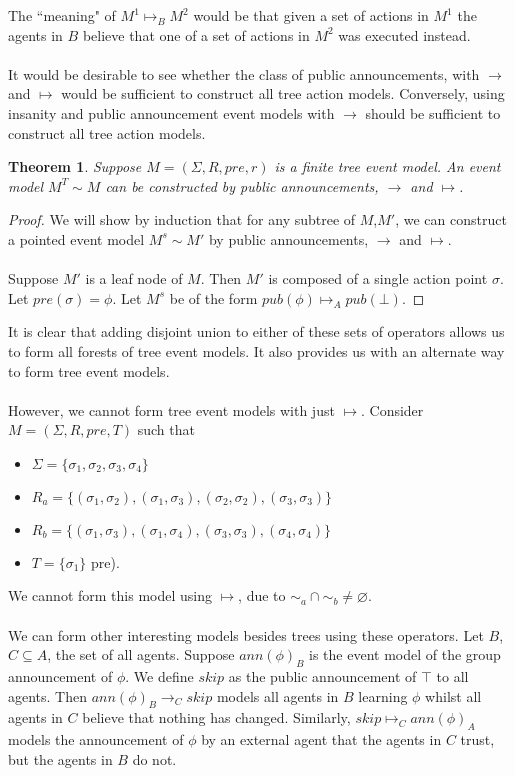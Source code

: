 \documentclass[12pt, a4paper, titlepage]{scrartcl}
\newtheorem{thm}{Theorem}[subsection]
\numberwithin{equation}{section}
\begin{document}
The ``meaning" of $M^1 \mapsto_B M^2$ would be that given a set of actions in
$M^1$ the agents in $B$ believe that one of a set of actions in $M^2$ was
executed instead.\\
\\
It would be desirable to see whether the class of public announcements, with
$\to$ and $\mapsto$ would be sufficient to construct all tree action
models.
Conversely, using insanity and public announcement event models with $\to$ should be sufficient to construct
all tree action models.
\begin{thm}
Suppose $M = (\Sigma, R, pre, r)$ is a finite tree event model.
An event model $M^T \sim M$ can be constructed by public announcements, $\to$ and
$\mapsto$.
\end{thm}
\begin{proof}
We will show by induction that for any subtree of $M$,$M'$, we can construct a pointed event model
$M^s \sim M'$ by public announcements, $\to$ and $\mapsto$.\\
\\
Suppose $M'$ is a leaf node of $M$.
Then $M'$ is composed of a single action point $\sigma$.
Let $pre(\sigma) = \phi$.
Let $M^s$ be of the form $pub(\phi) \mapsto_A pub(\bot)$.
\end{proof}
It is clear that adding disjoint union to either of these sets of operators
allows us to form all forests of tree event models.
It also provides us with an alternate way to form tree event models.\\
\\
However, we cannot form tree event models with just $\mapsto$.
Consider $M = (\Sigma, R, pre, T)$ such that
\begin{itemize}
	\item $\Sigma = \{\sigma_1, \sigma_2, \sigma_3, \sigma_4\}$
	\item $R_a =
\{(\sigma_1,\sigma_2),(\sigma_1,\sigma_3),(\sigma_2,\sigma_2),(\sigma_3,\sigma_3)\}$
	\item $R_b = \{(\sigma_1,\sigma_3),(\sigma_1,\sigma_4),(\sigma_3,\sigma_3),(\sigma_4,\sigma_4)\}$
	\item $T = \{ \sigma_1 \}$
pre).
\end{itemize}
We cannot form this model using $ \mapsto $, due to $\sim_a \cap \sim_b \neq
\varnothing$.\\
\\
We can form other interesting models besides trees using these operators.
Let $B$, $C \subseteq A$, the set of all agents.
Suppose $ann(\phi)_B$ is the event model of the group announcement of $\phi$.
We define $skip$ as the public announcement of $\top$ to all agents.
Then $ann(\phi)_B \to_C skip$ models all agents in $B$ learning $\phi$ whilst all agents in $C$
believe that nothing has changed.
Similarly, $skip \mapsto_C ann(\phi)_A$ models the announcement of $\phi$ by an external agent that
the agents in $C$ trust, but the agents in $B$ do not.\\
\\
\end{document}
